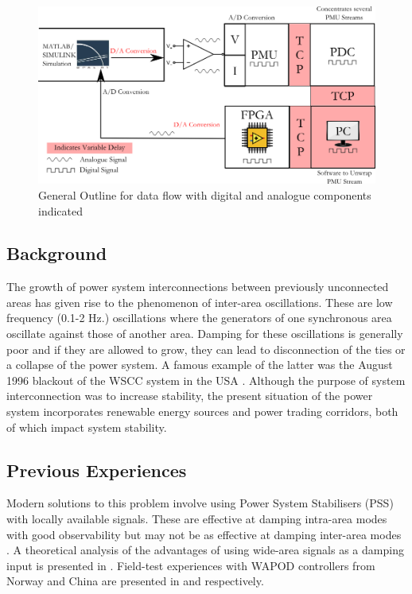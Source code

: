 \documentclass[conference]{IEEEtran}
\begin{document}
\begin{figure}[!t]
\centering
\includegraphics[width=5in]{DataFlow.png}
\caption{General Outline for data flow with digital and analogue components indicated}
\label{Data_path}
\end{figure}

\subsection{Background}
The growth of power system interconnections between previously unconnected areas has given rise to the phenomenon of inter-area oscillations. These are low frequency (0.1-2 Hz.) oscillations where the generators of one synchronous area oscillate against those of another area. Damping for these oscillations is generally poor and if they are allowed to grow, they can lead to disconnection of the ties or a collapse of the power system. A famous example of the latter was the August 1996 blackout of the WSCC system in the USA \cite{NAERC}. Although the purpose of system interconnection was to increase stability, the present situation of the power system incorporates renewable energy sources and power trading corridors, both of which impact system stability.\\

\subsection{Previous Experiences}
Modern solutions to this problem involve using Power System Stabilisers (PSS) with locally available signals. These are effective at damping intra-area modes with good observability but may not be as effective at damping inter-area modes \cite{Dmello} \cite{localREMcomparison}. A theoretical analysis of the advantages of using wide-area signals as a damping input is presented in \cite{Yuwa}. Field-test experiences with WAPOD controllers from Norway and China are presented in \cite{WAPODNorway} and \cite{WAPODChina} respectively.
\end{document}
